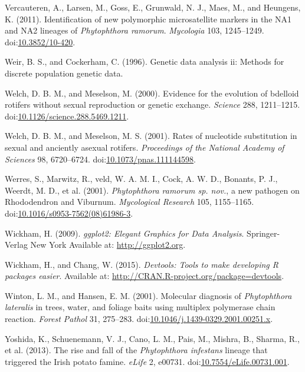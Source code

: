 \documentclass[double,12pt]{beavtex}
\begin{document}
  \hypertarget{ref-vercauteren2011identification}{}
  Vercauteren, A., Larsen, M., Goss, E., Grunwald, N. J., Maes, M., and
  Heungens, K. (2011). Identification of new polymorphic microsatellite
  markers in the NA1 and NA2 lineages of \emph{Phytophthora ramorum}.
  \emph{Mycologia} 103, 1245--1249.
  doi:\href{https://doi.org/10.3852/10-420}{10.3852/10-420}.
  
  \hypertarget{ref-weir1996genetic}{}
  Weir, B. S., and Cockerham, C. (1996). Genetic data analysis ii: Methods
  for discrete population genetic data.
  
  \hypertarget{ref-welch2000evidence}{}
  Welch, D. B. M., and Meselson, M. (2000). Evidence for the evolution of
  bdelloid rotifers without sexual reproduction or genetic exchange.
  \emph{Science} 288, 1211--1215.
  doi:\href{https://doi.org/10.1126/science.288.5469.1211}{10.1126/science.288.5469.1211}.
  
  \hypertarget{ref-welch2001rates}{}
  Welch, D. B. M., and Meselson, M. S. (2001). Rates of nucleotide
  substitution in sexual and anciently asexual rotifers. \emph{Proceedings
  of the National Academy of Sciences} 98, 6720--6724.
  doi:\href{https://doi.org/10.1073/pnas.111144598}{10.1073/pnas.111144598}.
  
  \hypertarget{ref-werres2001phytophthora}{}
  Werres, S., Marwitz, R., veld, W. A. M. I., Cock, A. W. D., Bonants, P.
  J., Weerdt, M. D., et al. (2001). \emph{Phytophthora ramorum sp. nov.},
  a new pathogen on Rhododendron and Viburnum. \emph{Mycological Research}
  105, 1155--1165.
  doi:\href{https://doi.org/10.1016/s0953-7562(08)61986-3}{10.1016/s0953-7562(08)61986-3}.
  
  \hypertarget{ref-wickham2009ggplot2}{}
  Wickham, H. (2009). \emph{ggplot2: Elegant Graphics for Data Analysis}.
  Springer-Verlag New York Available at: \url{http://ggplot2.org}.
  
  \hypertarget{ref-wickham2015devtools}{}
  Wickham, H., and Chang, W. (2015). \emph{Devtools: Tools to make
  developing R packages easier}. Available at:
  \url{http://CRAN.R-project.org/package=devtools}.
  
  \hypertarget{ref-winton2001molecular}{}
  Winton, L. M., and Hansen, E. M. (2001). Molecular diagnosis of
  \emph{Phytophthora lateralis} in trees, water, and foliage baits using
  multiplex polymerase chain reaction. \emph{Forest Pathol} 31, 275--283.
  doi:\href{https://doi.org/10.1046/j.1439-0329.2001.00251.x}{10.1046/j.1439-0329.2001.00251.x}.
  
  \hypertarget{ref-yoshida2013rise}{}
  Yoshida, K., Schuenemann, V. J., Cano, L. M., Pais, M., Mishra, B.,
  Sharma, R., et al. (2013). The rise and fall of the \emph{Phytophthora
  infestans} lineage that triggered the Irish potato famine. \emph{eLife}
  2, e00731.
  doi:\href{https://doi.org/10.7554/eLife.00731.001}{10.7554/eLife.00731.001}.
\end{document}
